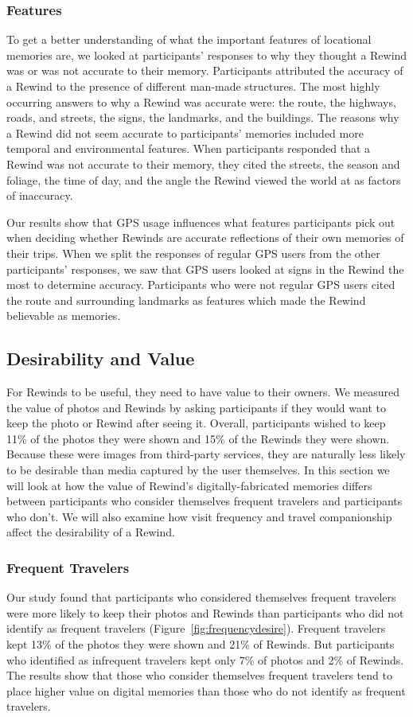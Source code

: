 \documentclass{sigchi}
\begin{document}
\subsubsection{Features}
To get a better understanding of what the important features of locational memories are, we looked at participants' responses to why they thought a Rewind was or was not accurate to their memory. Participants attributed the accuracy of a Rewind to the presence of different man-made structures. The most highly occurring answers to why a Rewind was accurate were: the route, the highways, roads, and streets, the signs, the landmarks, and the buildings. The reasons why a Rewind did not seem accurate to participants' memories included more temporal and environmental features. When participants responded that a Rewind was not accurate to their memory, they cited the streets, the season and foliage, the time of day, and the angle the Rewind viewed the world at as factors of inaccuracy.

Our results show that GPS usage influences what features participants pick out when deciding whether Rewinds are accurate reflections of their own memories of their trips. When we split the responses of regular GPS users from the other participants' responses, we saw that GPS users looked at signs in the Rewind the most to determine accuracy. Participants who were not regular GPS users cited the route and surrounding landmarks as features which made the Rewind believable as memories.

\subsection{Desirability and Value}
For Rewinds to be useful, they need to have value to their owners. We measured the value of photos and Rewinds by asking participants if they would want to keep the photo or Rewind after seeing it. Overall, participants wished to keep 11\% of the photos they were shown and 15\% of the Rewinds they were shown. Because these were images from third-party services, they are naturally less likely to be desirable than media captured by the user themselves. In this section we will look at how the value of Rewind's digitally-fabricated memories differs between participants who consider themselves frequent travelers and participants who don't. We will also examine how visit frequency and travel companionship affect the desirability of a Rewind.

\subsubsection{Frequent Travelers}
Our study found that participants who considered themselves frequent travelers were more likely to keep their photos and Rewinds than participants who did not identify as frequent travelers (Figure~\ref{fig:frequencydesire}). Frequent travelers kept 13\% of the photos they were shown and 21\% of Rewinds. But participants who identified as infrequent travelers kept only 7\% of photos and 2\% of Rewinds. The results show that those who consider themselves frequent travelers tend to place higher value on digital memories than those who do not identify as frequent travelers.
\end{document}

